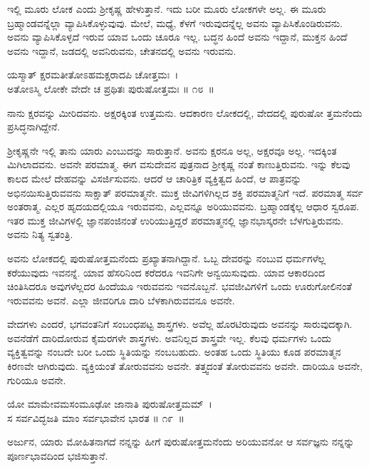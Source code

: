 ಇಲ್ಲಿ ಮೂರು ಲೋಕ ಎಂದು ಶ‍್ರೀಕೃಷ್ಣ ಹೇಳುತ್ತಾನೆ. ಇದು ಬರೀ ಮೂರು ಲೋಕಗಳೇ ಅಲ್ಲ. ಈ ಮೂರು ಬ್ರಹ್ಮಾಂಡವನ್ನೆಲ್ಲಾ ವ್ಯಾಪಿಸಿಕೊಳ್ಳುವುವು. ಮೇಲೆ, ಮಧ್ಯೆ, ಕೆಳಗೆ ಇರುವುದನ್ನೆಲ್ಲ ಅವನು ವ್ಯಾಪಿಸಿಕೊಂಡಿರುವನು. ಅವನು ವ್ಯಾಪಿಸಿಕೊಳ್ಳದೆ ಇರುವ ಯಾವ ಒಂದು ಚೂರೂ ಇಲ್ಲ. ಬದ್ಧನ ಹಿಂದೆ ಅವನು ಇದ್ದಾನೆ, ಮುಕ್ತನ ಹಿಂದೆ ಅವನು ಇದ್ದಾನೆ, ಜಡದಲ್ಲಿ ಅವನಿರುವನು, ಚೇತನದಲ್ಲಿ ಅವನು ಇರುವನು.

\begin{shloka}
ಯಸ್ಮಾತ್ ಕ್ಷರಮತೀತೋಽಹಮಕ್ಷರಾದಪಿ ಚೋತ್ತಮಃ~।\\ಅತೋಽಸ್ಮಿ ಲೋಕೇ ವೇದೇ ಚ ಪ್ರಥಿತಃ ಪುರುಷೋತ್ತಮಃ \hfill॥ ೧೮~॥
\end{shloka}

\begin{artha}
ನಾನು ಕ್ಷರವನ್ನು ಮೀರಿದವನು. ಅಕ್ಷರಕ್ಕಿಂತ ಉತ್ತಮನು. ಆದಕಾರಣ ಲೋಕದಲ್ಲಿ, ವೇದದಲ್ಲಿ ಪುರುಷೋ ತ್ತಮನೆಂದು ಪ್ರಸಿದ್ಧನಾಗಿದ್ದೇನೆ.
\end{artha}

ಶ‍್ರೀಕೃಷ್ಣನೇ ಇಲ್ಲಿ ತಾನು ಯಾರು ಎಂಬುದನ್ನು ಸಾರುತ್ತಾನೆ. ಅವನು ಕ್ಷರನೂ ಅಲ್ಲ, ಅಕ್ಷರವೂ ಅಲ್ಲ. ಇದಕ್ಕಿಂತ ಮಿಗಿಲಾದವನು. ಅವನೇ ಪರಮಾತ್ಮ. ಈಗ ವಸುದೇವನ ಪುತ್ರನಾದ ಶ‍್ರೀಕೃಷ್ಣ ನಂತೆ ಕಾಣುತ್ತಿರುವನು. ಇನ್ನು ಕೆಲವು ಕಾಲದ ಮೇಲೆ ದೇಹವನ್ನು ವಿಸರ್ಜಿಸುವನು. ಆದರೆ ಆ ಚಾರಿತ್ರಿಕ ವ್ಯಕ್ತಿತ್ವದ ಹಿಂದೆ, ಆ ಪಾತ್ರವನ್ನು ಅಭಿನಯಿಸುತ್ತಿರುವವನು ಸಾಕ್ಷಾತ್ ಪರಮಾತ್ಮನೇ. ಮುಕ್ತ ಜೀವಿಗಳಿಗಿಲ್ಲದ ಶಕ್ತಿ ಪರಮಾತ್ಮನಿಗೆ ಇದೆ. ಪರಮಾತ್ಮ ಸರ್ವ ಅಂತರಾತ್ಮ. ಎಲ್ಲರ ಹೃದಯದಲ್ಲಿಯೂ ಇರುವವನು, ಎಲ್ಲವನ್ನೂ ಅರಿಯುವವನು. ಬ್ರಹ್ಮಾಂಡಕ್ಕೆಲ್ಲ ಆಧಾರ ಸ್ವರೂಪ. ಇತರ ಮುಕ್ತ ಜೀವಿಗಳಲ್ಲಿ ಜ್ಞಾನಪಂಜಿನಂತೆ ಉರಿಯುತ್ತಿದ್ದರೆ ಪರಮಾತ್ಮನಲ್ಲಿ ಜ್ಞಾನಭಾಸ್ಕರನೇ ಬೆಳಗುತ್ತಿರುವನು. ಅವನು ನಿತ್ಯ ಸ್ವತಂತ್ರಿ.

ಅವನು ಲೋಕದಲ್ಲಿ ಪುರುಷೋತ್ತಮನೆಂದು ಪ್ರಖ್ಯಾತನಾಗಿದ್ದಾನೆ. ಒಬ್ಬ ದೇವರನ್ನು ನಂಬುವ ಧರ್ಮಗಳೆಲ್ಲ ಕರೆಯುವುದು ಇವನನ್ನೆ. ಯಾವ ಹೆಸರಿನಿಂದ ಕರೆದರೂ ಇವನಿಗೇ ಅನ್ವಯಿಸುವುದು. ಯಾವ ಆಕಾರದಿಂದ ಚಿಂತಿಸಿದರೂ ಅವುಗಳೆಲ್ಲದರ ಹಿಂದೆಯೂ ಇರುವವನು ಇವನೊಬ್ಬನೆ. ಭವಜೀವಿಗಳಿಗೆ ಒಂದು ಊರುಗೋಲಿನಂತೆ ಇರುವವನು ಅವನೆ. ಎಲ್ಲಾ ಜೀವರಿಗೂ ದಾರಿ ಬೆಳಕಾಗಿರುವವನೂ ಅವನೇ.

ವೇದಗಳು ಎಂದರೆ, ಭಗವಂತನಿಗೆ ಸಂಬಂಧಪಟ್ಟ ಶಾಸ್ತ್ರಗಳು. ಅವೆಲ್ಲ ಹೊರಟಿರುವುದು ಅವನನ್ನು ಸಾರುವುದಕ್ಕಾಗಿ. ಅವನೆಡೆಗೆ ದಾರಿದೋರುವ ಕೈಮರಗಳೇ ಶಾಸ್ತ್ರಗಳು. ಅವನಿಲ್ಲದ ಶಾಸ್ತ್ರವೇ ಇಲ್ಲ. ಕೆಲವು ಧರ್ಮಗಳು ಒಂದು ವ್ಯಕ್ತಿತ್ವವನ್ನು ನಂಬದೇ ಬರೀ ಒಂದು ಸ್ಥಿತಿಯನ್ನು ನಂಬಬಹುದು. ಅಂತಹ ಒಂದು ಸ್ಥಿತಿಯು ಕೂಡ ಪರಮಾತ್ಮನ ಕಿರಣವೇ ಆಗಿರುವುದು. ವ್ಯಕ್ತಿಯಂತೆ ತೋರುವವನು ಅವನೇ. ತತ್ತ್ವದಂತೆ ತೋರುವವನು ಅವನೇ. ದಾರಿಯೂ ಅವನೇ, ಗುರಿಯೂ ಅವನೇ.

\begin{shloka}
ಯೋ ಮಾಮೇವಮಸಂಮೂಢೋ ಜಾನಾತಿ ಪುರುಷೋತ್ತಮಮ್~।\\ಸ ಸರ್ವವಿದ್ಭಜತಿ ಮಾಂ ಸರ್ವಭಾವೇನ ಭಾರತ \hfill॥ ೧೯~॥
\end{shloka}

\begin{artha}
ಅರ್ಜುನ, ಯಾರು ಮೋಹಿತನಾಗದೆ ನನ್ನನ್ನು ಹೀಗೆ ಪುರುಷೋತ್ತಮನೆಂದು ಅರಿಯುವನೋ ಆ ಸರ್ವಜ್ಞನು ನನ್ನನ್ನು ಪೂರ್ಣಭಾವದಿಂದ ಭಜಿಸುತ್ತಾನೆ.
\end{artha}

